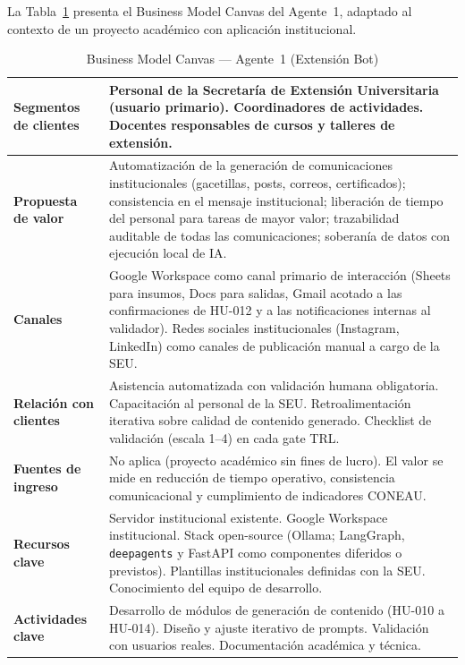 \documentclass[a4paper, 12pt]{article}
\begin{document}
La Tabla~\ref{tab:bmc} presenta el Business Model Canvas del Agente~1, adaptado al contexto de un proyecto acad\'emico con aplicaci\'on institucional.

\begin{table}[H]
  \centering
  \caption{Business Model Canvas --- Agente~1 (Extensi\'on Bot)}
  \label{tab:bmc}
  \footnotesize
  \begin{tabularx}{\textwidth}{|l|X|}
    \hline
    \textbf{Segmentos de clientes} &
    Personal de la Secretar\'ia de Extensi\'on Universitaria (usuario primario). Coordinadores de actividades. Docentes responsables de cursos y talleres de extensi\'on. \\
    \hline
    \textbf{Propuesta de valor} &
    Automatizaci\'on de la generaci\'on de comunicaciones institucionales (gacetillas, posts, correos, certificados); consistencia en el mensaje institucional; liberaci\'on de tiempo del personal para tareas de mayor valor; trazabilidad auditable de todas las comunicaciones; soberan\'ia de datos con ejecuci\'on local de IA. \\
    \hline
    \textbf{Canales} &
    Google Workspace como canal primario de interacci\'on (Sheets para insumos, Docs para salidas, Gmail acotado a las confirmaciones de HU-012 y a las notificaciones internas al validador). Redes sociales institucionales (Instagram, LinkedIn) como canales de publicaci\'on manual a cargo de la \ac{SEU}. \\
    \hline
    \textbf{Relaci\'on con clientes} &
    Asistencia automatizada con validaci\'on humana obligatoria. Capacitaci\'on al personal de la SEU. Retroalimentaci\'on iterativa sobre calidad de contenido generado. Checklist de validaci\'on (escala 1--4) en cada gate TRL. \\
    \hline
    \textbf{Fuentes de ingreso} &
    No aplica (proyecto acad\'emico sin fines de lucro). El valor se mide en reducci\'on de tiempo operativo, consistencia comunicacional y cumplimiento de indicadores CONEAU. \\
    \hline
    \textbf{Recursos clave} &
    Servidor institucional existente. Google Workspace institucional. Stack open-source (Ollama; LangGraph, \texttt{deepagents} y FastAPI como componentes diferidos o previstos). Plantillas institucionales definidas con la SEU. Conocimiento del equipo de desarrollo. \\
    \hline
    \textbf{Actividades clave} &
    Desarrollo de m\'odulos de generaci\'on de contenido (HU-010 a HU-014). Dise\~no y ajuste iterativo de prompts. Validaci\'on con usuarios reales. Documentaci\'on acad\'emica y t\'ecnica. \\

\end{tabularx}
\end{table}
\end{document}
